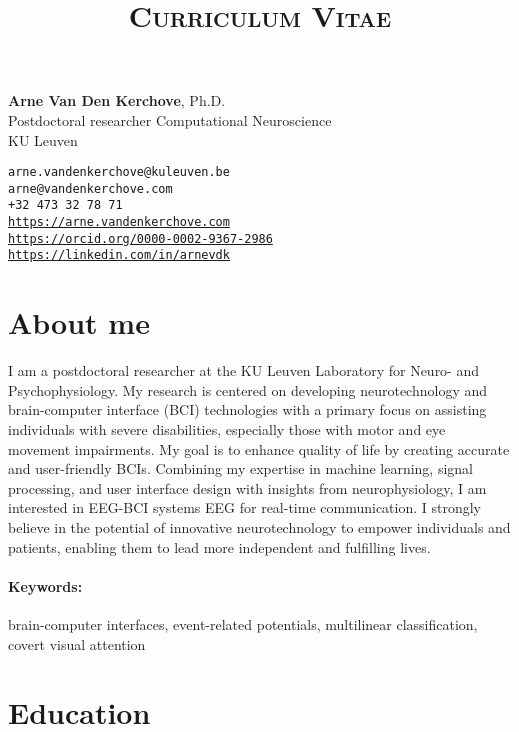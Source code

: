 \documentclass[10pt,a4paper]{article}
\title{\textsc{Curriculum Vitae}}
\date{}
\begin{document}
\maketitle

  \Large\textbf{Arne Van Den Kerchove}, Ph.D.\\
	\normalsize Postdoctoral researcher Computational Neuroscience\\
	KU Leuven
	\bigskip

	\texttt{arne.vandenkerchove@kuleuven.be \\
		arne@vandenkerchove.com \\
		+32 473 32 78 71 \\
		\url{https://arne.vandenkerchove.com}\\
		\url{https://orcid.org/0000-0002-9367-2986} \\
		\url{https://linkedin.com/in/arnevdk} \\}


\section*{About me}

I am a postdoctoral researcher at the KU Leuven Laboratory for Neuro- and
Psychophysiology. My research is centered on developing neurotechnology and brain-computer
interface (BCI) technologies with a primary focus on assisting individuals with
severe disabilities, especially those with motor and eye movement impairments.
My goal is to enhance quality of life by creating accurate and
user-friendly BCIs. Combining my expertise in machine learning, signal
processing, and user interface design with insights from neurophysiology, I am
interested in EEG-BCI systems EEG for real-time communication.
I strongly believe in the potential of innovative neurotechnology to empower
individuals and patients, enabling them to lead more independent and fulfilling lives.

\paragraph{Keywords:} brain-computer interfaces, event-related
potentials, multilinear classification, covert visual attention

\section*{Education}
\end{document}

